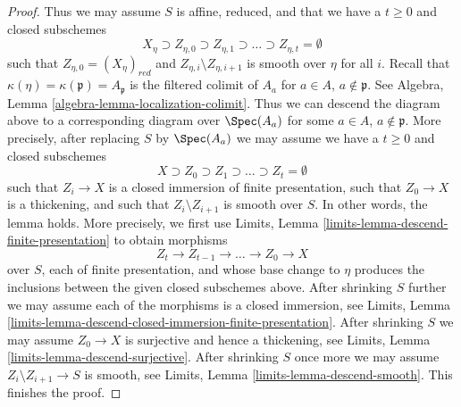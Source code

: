 \begin{proof}
\medskip\noindent
Thus we may assume $S$ is affine, reduced, and that we have a $t \geq 0$
and closed subschemes
$$
X_\eta \supset Z_{\eta, 0} \supset Z_{\eta, 1}
\supset \ldots \supset Z_{\eta, t} = \emptyset
$$
such that $Z_{\eta, 0} = (X_\eta)_{red}$ and
$Z_{\eta, i} \setminus Z_{\eta, i + 1}$
is smooth over $\eta$ for all $i$.
Recall that $\kappa(\eta) = \kappa(\mathfrak p) = A_\mathfrak p$ is
the filtered colimit of $A_a$ for $a \in A$, $a \not \in \mathfrak p$.
See Algebra, Lemma \ref{algebra-lemma-localization-colimit}.
Thus we can descend the diagram above to a corresponding diagram
over $\Spec(A_a)$ for some $a \in A$, $a \not \in \mathfrak p$.
More precisely, after replacing $S$ by $\Spec(A_a)$
we may assume we have a $t \geq 0$ and closed subschemes
$$
X \supset Z_0 \supset Z_1 \supset \ldots \supset Z_t = \emptyset
$$
such that $Z_i \to X$ is a closed immersion of finite presentation,
such that $Z_0 \to X$ is a thickening, and such that $Z_i \setminus Z_{i + 1}$
is smooth over $S$. In other words, the lemma holds.
More precisely, we first use
Limits, Lemma \ref{limits-lemma-descend-finite-presentation}
to obtain morphisms
$$
Z_t \to Z_{t - 1} \to \ldots \to Z_0 \to X
$$
over $S$, each of finite presentation, and whose
base change to $\eta$ produces the inclusions between the given
closed subschemes above. After shrinking $S$ further we may assume
each of the morphisms is a closed immersion, see
Limits, Lemma
\ref{limits-lemma-descend-closed-immersion-finite-presentation}.
After shrinking $S$ we may assume $Z_0 \to X$ is surjective
and hence a thickening, see
Limits, Lemma \ref{limits-lemma-descend-surjective}.
After shrinking $S$ once more we may assume
$Z_i \setminus Z_{i + 1} \to S$ is smooth, see
Limits, Lemma \ref{limits-lemma-descend-smooth}.
This finishes the proof.
\end{proof}